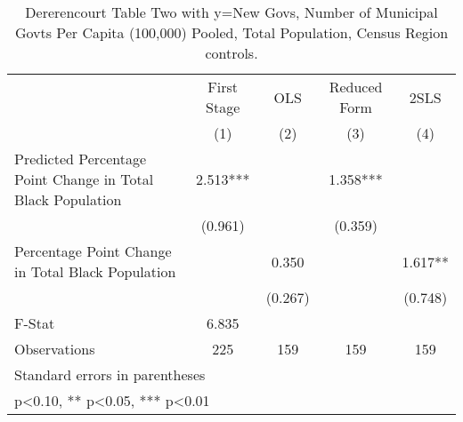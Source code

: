 \begin{table}[htbp]\centering
\def\sym#1{\ifmmode^{#1}\else\(^{#1}\)\fi}
\caption{Dererencourt Table Two with y=New Govs, Number of Municipal Govts Per Capita (100,000) Pooled, Total Population, Census Region controls.}
\begin{tabular}{l*{4}{c}}
\toprule
                    & First Stage   &         OLS   &Reduced Form   &        2SLS   \\
                    &\multicolumn{1}{c}{(1)}   &\multicolumn{1}{c}{(2)}   &\multicolumn{1}{c}{(3)}   &\multicolumn{1}{c}{(4)}   \\
\midrule
Predicted Percentage Point Change in Total Black Population&       2.513***&               &       1.358***&               \\
                    &     (0.961)   &               &     (0.359)   &               \\
\addlinespace
Percentage Point Change in Total Black Population&               &       0.350   &               &       1.617** \\
                    &               &     (0.267)   &               &     (0.748)   \\
\midrule
F-Stat              &       6.835   &               &               &               \\
Observations        &         225   &         159   &         159   &         159   \\
\bottomrule
\multicolumn{5}{l}{\footnotesize Standard errors in parentheses}\\
\multicolumn{5}{l}{\footnotesize * p<0.10, ** p<0.05, *** p<0.01}\\
\end{tabular}
\end{table}
